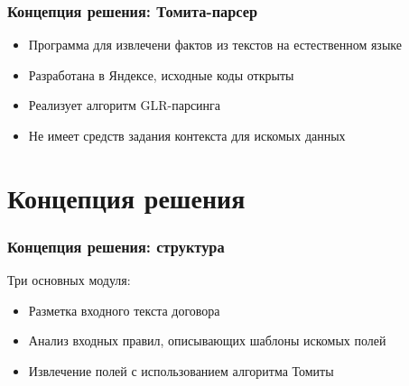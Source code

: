 \documentclass[10pt]{beamer}
\begin{document}
\begin{frame}
\frametitle{Концепция решения: Томита-парсер}
\begin{itemize}
	\item Программа для извлечени фактов из текстов на естественном языке
	\item Разработана в Яндексе, исходные коды открыты
	\item Реализует алгоритм GLR-парсинга
	\item Не имеет средств задания контекста для искомых данных
\end{itemize}
\end{frame}

\section{Концепция решения}
\begin{frame}
\frametitle{Концепция решения: структура}
Три основных модуля:
\begin{itemize}
	\item Разметка входного текста договора
	\item Анализ входных правил, описывающих шаблоны искомых полей
	\item Извлечение полей с использованием алгоритма Томиты
\end{itemize}
\end{frame}

\end{document}
